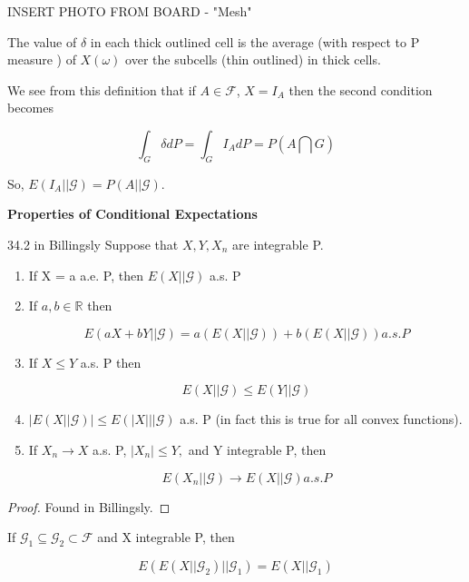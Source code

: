 \documentclass[11pt,fleqn]{book} %
\begin{document}
\begin{enumerate}
			INSERT PHOTO FROM BOARD - "Mesh"


	The value of $\delta$ in each thick outlined cell is the average (with respect to P measure ) of $X(\omega)$ over the subcells (thin outlined) in thick cells. 

	We see from this definition that if  $ A \in \mathcal{F}$, $X = I_A$ then the second condition becomes 

			$$\int_G \delta dP = \int_G I_A dP = P(A \bigcap G) $$

	So, $E(I_A||\mathcal{G}) = P(A || \mathcal{G})$. 

	\textbf{Properties of Conditional Expectations}\\

	\begin{theorem}{34.2 in Billingsly}
		Suppose that $X, Y, X_n$ are integrable P.\\

			\begin{enumerate}
				\item If X = a a.e. P, then $E(X || \mathcal{G})$ a.s. P\\

				\item If $a, b \in \mathbb{R}$ then

						$$E(aX + bY || \mathcal{G}) = a(E(X ||\mathcal{G})) + b(E(X || \mathcal{G})) a.s. P $$
				\item If $X \leq Y$ a.s. P then 

						$$E(X ||\mathcal{G}) \leq E(Y ||\mathcal{G}) $$
				\item $|E(X||\mathcal{G})| \leq E(|X| ||\mathcal{G})$ a.s. P (in fact this is true for all convex functions).
				\item If $X_n \rightarrow X$ a.s. P, $|X_n| \leq Y,$ and Y integrable P, then

						$$E(X_n ||\mathcal{G}) \rightarrow E(X ||\mathcal{G}) a.s. P $$
			\end{enumerate}

	\end{theorem}

	\begin{proof}
		Found in Billingsly. 
	\end{proof}

	\begin{theorem}[34.4 in Billingsly]
		If $\mathcal{G}_1 \subseteq \mathcal{G}_2 \subset \mathcal{F}$ and X integrable P, then

				$$E(E(X ||\mathcal{G}_2)|| \mathcal{G}_1) = E(X ||\mathcal{G}_1) $$


\end{theorem}
\end{enumerate}
\end{document}
